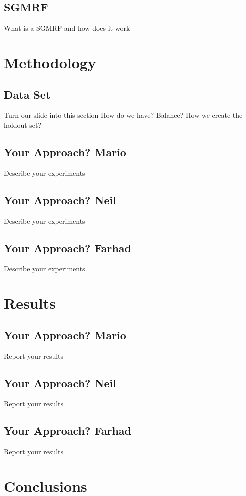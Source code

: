 \documentclass{article} %
\begin{document}
\subsection{SGMRF}
What is a SGMRF and how does it work


\section{Methodology}

\subsection{Data Set}
Turn our slide into this section
How do we have? Balance? 
How we create the holdout set?


\subsection{Your Approach? Mario}
Describe your experiments

\subsection{Your Approach? Neil}
Describe your experiments

\subsection{Your Approach? Farhad}
Describe your experiments

\section{Results}

\subsection{Your Approach? Mario}
Report your results

\subsection{Your Approach? Neil}
Report your results

\subsection{Your Approach? Farhad}
Report your results

\section{Conclusions}





	
\end{document}
